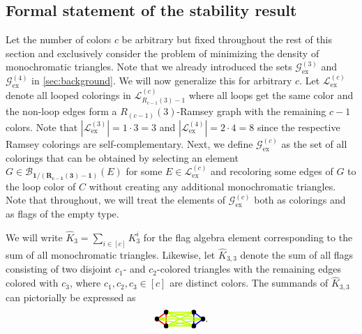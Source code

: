 \documentclass[a4paper,11pt]{article}
\numberwithin{equation}{section}
\newcommand{\mB}{\mathcal{B}}
\newcommand{\mG}{\mathcal{G}}
\newcommand{\mL}{\mathcal{L}}
\begin{document}
\subsection{Formal statement of the stability result}\label{sec:formal_statement_theorem}

Let the number of colors $c$ be arbitrary but fixed throughout the rest of this section and exclusively consider the problem of minimizing the density of monochromatic triangles. %
Note that we already introduced the sets $\mG_{\operatorname{ex}}^{(3)}$ and $\mG_{\operatorname{ex}}^{(4)}$ in \cref{sec:background}. We will now generalize this for arbitrary $c$. Let $\mL_{\operatorname{ex}}^{(c)}$ denote all looped colorings in $\mL^{(c)}_{R_{c-1}(3)-1}$ where all loops get the same color and the non-loop edges form a $R_{(c-1)}(3)$-Ramsey graph with the remaining $c-1$ colors. Note that $|\mL_{\operatorname{ex}}^{(3)}| = 1 \cdot 3 = 3$ and $|\mL_{\operatorname{ex}}^{(4)}| = 2 \cdot 4 = 8$ since the respective Ramsey colorings are self-complementary. Next, we define $\mG^{(c)}_{\operatorname{ex}}$ as the set of all colorings
that can be obtained by selecting an element $G\in\mB_\mathbf{1/(R_{c-1}(3)-1)} (E)$ for some $E \in\mL_{\operatorname{ex}}^{(c)}$ and recoloring some edges of $G$ to the loop color of $C$ without creating any additional monochromatic triangles. Note that throughout, we will treat the elements of $\mG^{(c)}_{\operatorname{ex}}$ both as colorings and as flags of the empty type.

%
We will write $\hat K_3 = \sum_{i \in [c]} K_3^i$ for
the flag algebra element corresponding to the sum of all monochromatic triangles. Likewise, let $\hat K_{3,3}$ denote the sum of all flags consisting of two disjoint $c_1$- and $c_2$-colored triangles with the remaining edges colored with $c_3$, where $c_1,c_2,c_3\in [c]$ are distinct colors. The summands of $\hat K_{3,3}$ can pictorially be expressed as 
\[   
   \begin{tikzpicture}[line width=0.4mm, baseline=1ex,
        scale = 0.5]
        \node[circle,fill=black,draw,scale=0.4] (A) at (0,0) {};
        \node[circle,fill=black,draw, scale=0.4] (B) at (0,1) {};
        \node[circle,fill=black,draw, scale=0.4] (C) at (-0.66,0.5) {};
        \draw[red] (A) -- (B);
        \draw[red] (A) -- (C);
        \draw[red] (B) -- (C);
        \node[circle,fill=black,draw,scale=0.4] (E) at (2,0) {};
        \node[circle,fill=black,draw, scale=0.4] (F) at (2,1) {};
        \node[circle,fill=black,draw, scale=0.4] (G) at (2.66,0.5) {};
        \draw[blue] (E) -- (F);
        \draw[blue] (E) -- (G);
        \draw[blue] (F) -- (G);

        \draw[lime] (A) -- (E);
        \draw[lime] (B) -- (E);
        \draw[lime] (C) -- (E);
        \draw[lime] (A) -- (F);
        \draw[lime] (B) -- (F);
        \draw[lime] (C) -- (F);
        \draw[lime] (A) -- (G);
        \draw[lime] (B) -- (G);
        \draw[lime] (C) -- (G);
        
    \end{tikzpicture}.
\]
\end{document}
